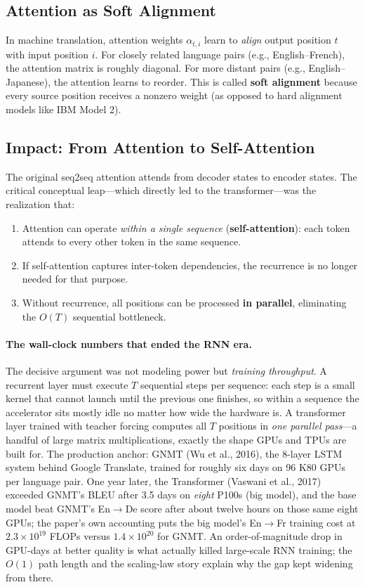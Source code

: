 \subsection{Attention as Soft Alignment}

In machine translation, attention weights $\alpha_{t,i}$ learn to
\emph{align} output position $t$ with input position $i$.  For closely
related language pairs (e.g., English--French), the attention matrix is
roughly diagonal.  For more distant pairs (e.g., English--Japanese), the
attention learns to reorder.  This is called \textbf{soft alignment}
because every source position receives a nonzero weight (as opposed to
hard alignment models like IBM Model 2).

\subsection{Impact: From Attention to Self-Attention}

The original seq2seq attention attends from decoder states to encoder
states.  The critical conceptual leap---which directly led to the
transformer---was the realization that:

\begin{enumerate}[leftmargin=*]
\item Attention can operate \emph{within a single sequence}
  (\textbf{self-attention}): each token attends to every other token in
  the same sequence.
\item If self-attention captures inter-token dependencies, the recurrence
  is no longer needed for that purpose.
\item Without recurrence, all positions can be processed \textbf{in
  parallel}, eliminating the $O(T)$ sequential bottleneck.
\end{enumerate}

\paragraph{The wall-clock numbers that ended the RNN era.}
The decisive argument was not modeling power but \emph{training
throughput}.  A recurrent layer must execute $T$ sequential steps per
sequence: each step is a small kernel that cannot launch until the previous
one finishes, so within a sequence the accelerator sits mostly idle no
matter how wide the hardware is.  A transformer layer trained with teacher
forcing computes all $T$ positions in \emph{one parallel pass}---a handful
of large matrix multiplications, exactly the shape GPUs and TPUs are built
for.  The production anchor: GNMT (Wu et al., 2016), the 8-layer LSTM
system behind Google Translate, trained for roughly six days on 96 K80
GPUs per language pair.  One year later, the Transformer (Vaswani et al.,
2017) exceeded GNMT's BLEU after 3.5 days on \emph{eight} P100s (big
model), and the base model beat GNMT's En$\to$De score after about twelve
hours on those same eight GPUs; the paper's own accounting puts the big
model's En$\to$Fr training cost at $2.3 \times 10^{19}$ FLOPs versus
$1.4 \times 10^{20}$ for GNMT.  An order-of-magnitude drop in GPU-days at
better quality is what actually killed large-scale RNN training; the
$O(1)$ path length and the scaling-law story explain why the gap kept
widening from there.

